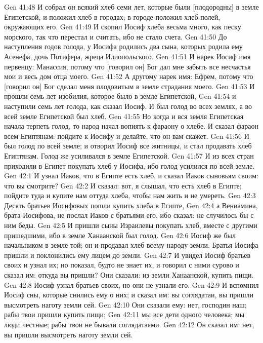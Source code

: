 \vs Gen 41:48 И собрал он всякий хлеб семи лет, которые были [плодородны] в земле Египетской, и положил хлеб в городах; в  городе положил хлеб полей, окружающих его.
\vs Gen 41:49 И скопил Иосиф хлеба весьма много, как песку морского, так что перестал и считать, ибо не стало счета.
\rsbpar\vs Gen 41:50 До наступления годов голода, у Иосифа родились два сына, которых родила ему Асенефа, дочь Потифера, жреца Илиопольского.
\vs Gen 41:51 И нарек Иосиф имя первенцу: Манассия, потому что [говорил он] Бог дал мне забыть все несчастья мои и весь дом отца моего.
\vs Gen 41:52 А другому нарек имя: Ефрем, потому что [говорил он] Бог сделал меня плодовитым в земле страдания моего.
\rsbpar\vs Gen 41:53 И прошли семь лет изобилия, которое было в земле Египетской,
\vs Gen 41:54 и наступили семь лет голода, как сказал Иосиф. И был голод во всех землях, а во всей земле Египетской был хлеб.
\vs Gen 41:55 Но когда и вся земля Египетская начала терпеть голод, то народ начал вопиять к фараону о хлебе. И сказал фараон всем Египтянам: пойдите к Иосифу и делайте, что он вам скажет.
\vs Gen 41:56 И был голод по всей земле; и отворил Иосиф все житницы, и стал продавать хлеб Египтянам. Голод же усиливался в земле Египетской.
\vs Gen 41:57 И из всех стран приходили в Египет покупать хлеб у Иосифа, ибо голод усилился по всей земле.
\vs Gen 42:1 И узнал Иаков, что в Египте есть хлеб, и сказал Иаков сыновьям своим: что вы смотрите?
\vs Gen 42:2 И сказал: вот, я слышал, что есть хлеб в Египте; пойдите туда и купите нам оттуда хлеба, чтобы нам жить и не умереть.
\vs Gen 42:3 Десять братьев Иосифовых пошли купить хлеба в Египте,
\vs Gen 42:4 а Вениамина, брата Иосифова, не послал Иаков с братьями его, ибо сказал: не случилось бы с ним беды.
\vs Gen 42:5 И пришли сыны Израилевы покупать хлеб, вместе с другими пришедшими, ибо в земле Ханаанской был голод.
\vs Gen 42:6 Иосиф же был начальником в земле той; он и продавал хлеб всему народу земли. Братья Иосифа пришли и поклонились ему лицем до земли.
\vs Gen 42:7 И увидел Иосиф братьев своих и узнал их; но показал, будто не знает их, и говорил с ними сурово и сказал им: откуда вы пришли? Они сказали: из земли Ханаанской, купить пищи.
\vs Gen 42:8 Иосиф узнал братьев своих, но они не узнали его.
\vs Gen 42:9 И вспомнил Иосиф сны, которые снились ему о них; и сказал им: вы соглядатаи, вы пришли высмотреть наготу земли сей.
\vs Gen 42:10 Они сказали ему: нет, господин наш; рабы твои пришли купить пищи;
\vs Gen 42:11 мы все дети одного человека; мы люди честные; рабы твои не бывали соглядатаями.
\vs Gen 42:12 Он сказал им: нет, вы пришли высмотреть наготу земли сей.
